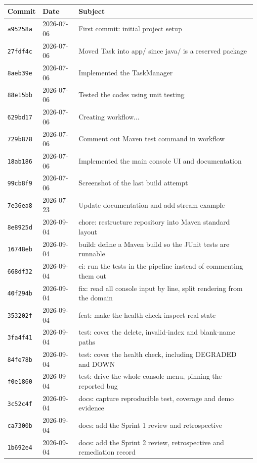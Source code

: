 \documentclass[11pt,a4paper]{article}
\newcommand{\code}[1]{\texttt{\small #1}}
\begin{document}
\begin{table}[h]
\centering
\small
\begin{tabularx}{\textwidth}{@{}l l X@{}}
\toprule
\textbf{Commit} & \textbf{Date} & \textbf{Subject} \\
\midrule
\code{a95258a} & 2026-07-06 & First commit: initial project setup \\
\code{27fdf4c} & 2026-07-06 & Moved Task into app/ since java/ is a reserved package \\
\code{8aeb39e} & 2026-07-06 & Implemented the TaskManager \\
\code{88e15bb} & 2026-07-06 & Tested the codes using unit testing \\
\code{629bd17} & 2026-07-06 & Creating workflow... \\
\code{729b878} & 2026-07-06 & Comment out Maven test command in workflow \\
\code{18ab186} & 2026-07-06 & Implemented the main console UI and documentation \\
\code{99cb8f9} & 2026-07-06 & Screenshot of the last build attempt \\
\code{7e36ea8} & 2026-07-23 & Update documentation and add stream example \\
\midrule
\code{8e8925d} & 2026-09-04 & chore: restructure repository into Maven standard layout \\
\code{16748eb} & 2026-09-04 & build: define a Maven build so the JUnit tests are runnable \\
\code{668df32} & 2026-09-04 & ci: run the tests in the pipeline instead of commenting them out \\
\code{40f294b} & 2026-09-04 & fix: read all console input by line, split rendering from the domain \\
\code{353202f} & 2026-09-04 & feat: make the health check inspect real state \\
\code{3fa4f41} & 2026-09-04 & test: cover the delete, invalid-index and blank-name paths \\
\code{84fe78b} & 2026-09-04 & test: cover the health check, including DEGRADED and DOWN \\
\code{f0e1860} & 2026-09-04 & test: drive the whole console menu, pinning the reported bug \\
\code{3c52c4f} & 2026-09-04 & docs: capture reproducible test, coverage and demo evidence \\
\code{ca7300b} & 2026-09-04 & docs: add the Sprint 1 review and retrospective \\
\code{1b692e4} & 2026-09-04 & docs: add the Sprint 2 review, retrospective and remediation record \\

\end{tabularx}
\end{table}
\end{document}
